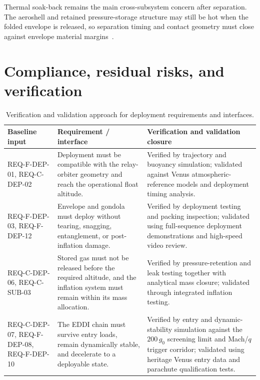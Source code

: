 Thermal soak-back remains the main cross-subsystem concern after separation. The aeroshell and retained pressure-storage structure may still be hot when the folded envelope is released, so separation timing and contact geometry must close against envelope material margins~\cite{Yavrouian2003}.

\section{Compliance, residual risks, and verification}
\label{sec:8-6}
\label{sec:8-6-1}
\label{sec:8-6-2}

\begin{table}[H]
\centering
\renewcommand{\arraystretch}{1}
\footnotesize
\caption{Verification and validation approach for deployment requirements and interfaces.}
\label{tab:deployment-vv}
\begin{tabularx}{\textwidth}{@{}p{} X X@{}}
\toprule
\textbf{Baseline input} & \textbf{Requirement / interface} & \textbf{Verification and validation closure} \\
\midrule

REQ-F-DEP-01, REQ-C-DEP-02 &
Deployment must be compatible with the relay-orbiter geometry and reach the operational float altitude. &
Verified by trajectory and buoyancy simulation; validated against Venus atmospheric-reference models and deployment timing analysis. \\

REQ-F-DEP-03, REQ-F-DEP-12 &
Envelope and gondola must deploy without tearing, snagging, entanglement, or post-inflation damage. &
Verified by deployment testing and packing inspection; validated using full-sequence deployment demonstrations and high-speed video review. \\

REQ-C-DEP-06, REQ-C-SUB-03 &
Stored gas must not be released before the required altitude, and the inflation system must remain within its mass allocation. &
Verified by pressure-retention and leak testing together with analytical mass closure; validated through integrated inflation testing. \\

REQ-C-DEP-07, REQ-F-DEP-08, REQ-F-DEP-10 &
The EDDI chain must survive entry loads, remain dynamically stable, and decelerate to a deployable state. &
Verified by entry and dynamic-stability simulation against the $200\,g_0$ screening limit and Mach/$q$ trigger corridor; validated using heritage Venus entry data and parachute qualification tests. \\


\end{tabularx}
\end{table}
